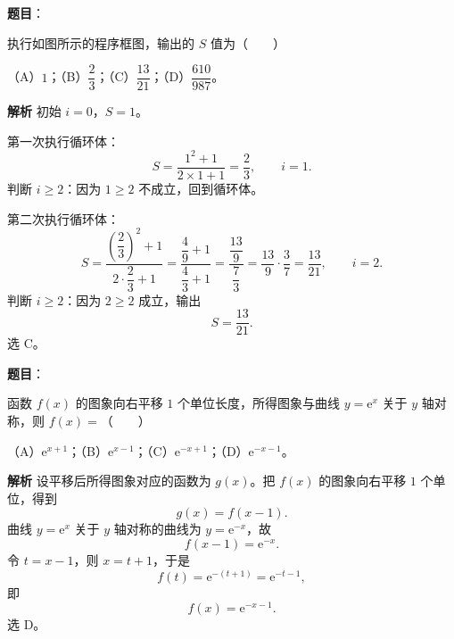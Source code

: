 \begin{answer}

\textbf{题目}：

执行如图所示的程序框图，输出的 $S$ 值为\mbox{（　　）}
\nopagebreak[4]
\begin{center}\end{center}
\nopagebreak[4]
（A）$1$；（B）$\dfrac23$；（C）$\dfrac{13}{21}$；（D）$\dfrac{610}{987}$。

\textbf{解析}
初始 $i=0$，$S=1$。

第一次执行循环体：
\nopagebreak[4]
\[S=\frac{1^2+1}{2\times1+1}=\frac23,\qquad i=1.\]
判断 $i\geqslant2$：因为 $1\geqslant2$ 不成立，回到循环体。

第二次执行循环体：
\nopagebreak[4]
\[S=\frac{\left(\dfrac23\right)^2+1}{2\cdot\dfrac23+1}
=\frac{\dfrac49+1}{\dfrac43+1}
=\frac{\dfrac{13}9}{\dfrac73}
=\frac{13}9\cdot\frac37=\frac{13}{21},\qquad i=2.\]
判断 $i\geqslant2$：因为 $2\geqslant2$ 成立，输出
\nopagebreak[4]
\[S=\frac{13}{21}.\]
选 C。


\end{answer}
\begin{answer}

\textbf{题目}：

函数 $f(x)$ 的图象向右平移 $1$ 个单位长度，所得图象与曲线 $y=\mathrm e^x$ 关于 $y$ 轴对称，则 $f(x)=$\mbox{（　　）}

（A）$\mathrm e^{x+1}$；（B）$\mathrm e^{x-1}$；（C）$\mathrm e^{-x+1}$；（D）$\mathrm e^{-x-1}$。

\textbf{解析}
设平移后所得图象对应的函数为 $g(x)$。把 $f(x)$ 的图象向右平移 $1$ 个单位，得到
\nopagebreak[4]
\[g(x)=f(x-1).\]
曲线 $y=\mathrm e^x$ 关于 $y$ 轴对称的曲线为 $y=\mathrm e^{-x}$，故
\nopagebreak[4]
\[f(x-1)=\mathrm e^{-x}.\]
令 $t=x-1$，则 $x=t+1$，于是
\nopagebreak[4]
\[f(t)=\mathrm e^{-(t+1)}=\mathrm e^{-t-1},\]
即
\nopagebreak[4]
\[f(x)=\mathrm e^{-x-1}.\]
选 D。


\end{answer}
